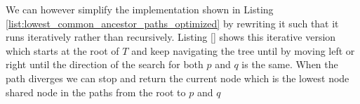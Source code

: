 \begin{minipage}{\linewidth}
	
\end{minipage}


We can however simplify the implementation shown in Listing \ref{list:lowest_common_ancestor_paths_optimized} by rewriting it such that it runs iteratively rather than recursively.
Listing \ref{} shows this iterative version which starts at the root of $T$ and keep navigating the tree until by moving left or right until the direction of the search for both $p$ and $q$ is the same.
When the path diverges we can stop and return the current node which is the lowest node shared node in the paths from the root to $p$ and $q$
\begin{minipage}{\linewidth}
	
\end{minipage}